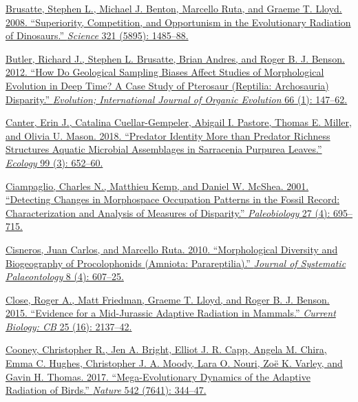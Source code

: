 \href{http://paperpile.com/b/sTGYvp/EeC8}{Brusatte, Stephen L., Michael
J. Benton, Marcello Ruta, and Graeme T. Lloyd. 2008. ``Superiority,
Competition, and Opportunism in the Evolutionary Radiation of
Dinosaurs.''
}\href{http://paperpile.com/b/sTGYvp/EeC8}{\emph{Science}}\href{http://paperpile.com/b/sTGYvp/EeC8}{
321 (5895): 1485--88.}

\href{http://paperpile.com/b/sTGYvp/aSSL}{Butler, Richard J., Stephen L.
Brusatte, Brian Andres, and Roger B. J. Benson. 2012. ``How Do
Geological Sampling Biases Affect Studies of Morphological Evolution in
Deep Time? A Case Study of Pterosaur (Reptilia: Archosauria)
Disparity.'' }\href{http://paperpile.com/b/sTGYvp/aSSL}{\emph{Evolution;
International Journal of Organic
Evolution}}\href{http://paperpile.com/b/sTGYvp/aSSL}{ 66 (1): 147--62.}

\href{http://paperpile.com/b/sTGYvp/60H0}{Canter, Erin J., Catalina
Cuellar-Gempeler, Abigail I. Pastore, Thomas E. Miller, and Olivia U.
Mason. 2018. ``Predator Identity More than Predator Richness Structures
Aquatic Microbial Assemblages in Sarracenia Purpurea Leaves.''
}\href{http://paperpile.com/b/sTGYvp/60H0}{\emph{Ecology}}\href{http://paperpile.com/b/sTGYvp/60H0}{
99 (3): 652--60.}

\href{http://paperpile.com/b/sTGYvp/ROH8}{Ciampaglio, Charles N.,
Matthieu Kemp, and Daniel W. McShea. 2001. ``Detecting Changes in
Morphospace Occupation Patterns in the Fossil Record: Characterization
and Analysis of Measures of Disparity.''
}\href{http://paperpile.com/b/sTGYvp/ROH8}{\emph{Paleobiology}}\href{http://paperpile.com/b/sTGYvp/ROH8}{
27 (4): 695--715.}

\href{http://paperpile.com/b/sTGYvp/khc9}{Cisneros, Juan Carlos, and
Marcello Ruta. 2010. ``Morphological Diversity and Biogeography of
Procolophonids (Amniota: Parareptilia).''
}\href{http://paperpile.com/b/sTGYvp/khc9}{\emph{Journal of Systematic
Palaeontology}}\href{http://paperpile.com/b/sTGYvp/khc9}{ 8 (4):
607--25.}

\href{http://paperpile.com/b/sTGYvp/PbSx}{Close, Roger A., Matt
Friedman, Graeme T. Lloyd, and Roger B. J. Benson. 2015. ``Evidence for
a Mid-Jurassic Adaptive Radiation in Mammals.''
}\href{http://paperpile.com/b/sTGYvp/PbSx}{\emph{Current Biology:
CB}}\href{http://paperpile.com/b/sTGYvp/PbSx}{ 25 (16): 2137--42.}

\href{http://paperpile.com/b/sTGYvp/RjqE}{Cooney, Christopher R., Jen A.
Bright, Elliot J. R. Capp, Angela M. Chira, Emma C. Hughes, Christopher
J. A. Moody, Lara O. Nouri, Zoë K. Varley, and Gavin H. Thomas. 2017.
``Mega-Evolutionary Dynamics of the Adaptive Radiation of Birds.''
}\href{http://paperpile.com/b/sTGYvp/RjqE}{\emph{Nature}}\href{http://paperpile.com/b/sTGYvp/RjqE}{
542 (7641): 344--47.}

